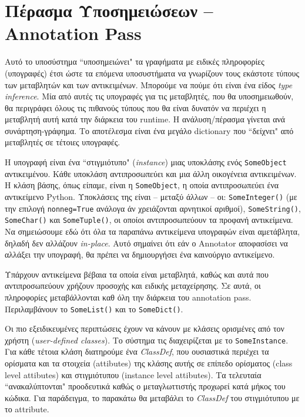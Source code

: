 \section{Πέρασμα Υποσημειώσεων – Annotation Pass}

Αυτό το υποσύστημα ``υποσημειώνει" τα γραφήματα με ειδικές πληροφορίες
(υπογραφές) έτσι ώστε τα επόμενα υποσυστήματα να γνωρίζουν τους εκάστοτε τύπους
των μεταβλητών και των αντικειμένων. Μπορούμε να πούμε ότι είναι ένα είδος
\textit{type inference}. Μία από αυτές τις υπογραφές για τις μεταβλητές, που θα
υποσημειωθούν, θα περιγράφει όλους τις πιθανούς τύπους που θα είναι δυνατόν να
περιέχει η μεταβλητή αυτή κατά την διάρκεια του runtime. Η ανάλυση/πέρασμα
γίνεται ανά συνάρτηση-γράφημα. Το αποτέλεσμα είναι ένα μεγάλο dictionary που
``δείχνει" από μεταβλητές σε τέτοιες υπογραφές.

Η υπογραφή είναι ένα ``στιγμιότυπο" (\textit{instance}) μιας υποκλάσης ενός
\texttt{SomeObject} αντικειμένου. Κάθε υποκλάση αντιπροσωπεύει και μια άλλη
οικογένεια αντικειμένων. Η κλάση βάσης, όπως είπαμε, είναι η
\texttt{SomeObject}, η οποία αντιπροσωπεύει ένα αντικείμενο Python. Υποκλάσεις
της είναι – μεταξύ άλλων – οι: \texttt{SomeInteger()} (με την επιλογή
\texttt{nonneg=True} ανάλογα άν χρειάζονται αρνητικοί αριθμοί),
\texttt{SomeString()}, \texttt{SomeChar()} και \texttt{SomeTuple()}, οι οποίοι
αντιπροσωπεύουν τα προφανή αντικείμενα. Να σημειώσουμε εδώ ότι όλα τα παραπάνω 
αντικείμενα υπογραφών είναι αμετάβλητα, δηλαδή δεν αλλάζουν \textit{in-place}. 
Αυτό σημαίνει ότι εάν ο Annotator αποφασίσει να αλλάξει την υπογραφή, θα 
πρέπει να δημιουργήσει ένα καινούργιο αντικείμενο.

Υπάρχουν αντικείμενα βέβαια τα οποία είναι μεταβλητά, καθώς και αυτά που
αντιπροσωπεύουν χρήζουν προσοχής και ειδικής μεταχείρησης. Σε αυτά, οι 
πληροφορίες μεταβάλλονται καθ όλη την διάρκεια του annotation pass.
Περιλαμβάνουν το \texttt{SomeList()} και το \texttt{SomeDict()}.

Οι πιο εξειδικευμένες περιπτώσεις έχουν να κάνουν με κλάσεις ορισμένες από τον
χρήστη (\textit{user-defined classes}). Το σύστημα τις διαχειρίζεται με το
\texttt{SomeInstance}. Για κάθε τέτοια κλάση διατηρούμε ένα \textit{ClassDef},
που ουσιαστικά περιέχει τα ορίσματα και τα στοιχεία (attibutes) της κλάσης αυτής
σε επίπεδο ορίσματος (class level attibutes) και στιγμιότυπου (instance level
attibutes). Τα τελευταία ``ανακαλύπτονται" προοδευτικά καθώς ο μεταγλωττιστής
προχωρεί κατά μήκος του κώδικα. Για παράδειγμα, το παρακάτω θα μεταβάλει το
\textit{ClassDef} του στιγμιότυπου με το attribute.

